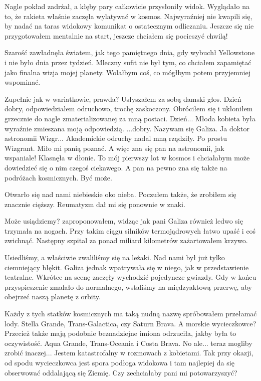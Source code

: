 Nagle pokład zadrżał, a kłęby pary całkowicie przysłoniły widok.
Wyglądało na to, że rakieta właśnie zaczęła wylatywać w kosmos.
Najwyraźniej nie kwapili się, by nadać na taras widokowy komunikat o ostatecznym odliczaniu.
Jeszcze się nie przygotowałem mentalnie na start, jeszcze chciałem się pocieszyć chwilą!

Szarość zawładnęła światem, jak tego pamiętnego dnia, gdy wybuchł Yellowstone i nie było dnia przez tydzień.
Mleczny sufit nie był tym, co chciałem zapamiętać jako finalna wizja mojej planety. Wolałbym coś, co mógłbym potem przyjemniej wspominać.

\begin{dialogue}
	\ds{} Zupełnie jak w wariatkowie, prawda? \dm{} Usłyszałem za sobą damski głos.
	\ds{} Dzień dobry,  \dm{} odpowiedziałem odruchowo, trochę zaskoczony. Obróciłem się i ukłoniłem grzecznie do nagle zmaterializowanej za mną postaci.
	\ds{} Dzień... \dm{} Młoda kobieta była wyraźnie zmieszana moją odpowiedzią. \dm{} ...dobry. Nazywam się Galiza.
	\ds{} Ja doktor astronomii Wizgr... \dm{} Akademickie odruchy nadal mną rządziły. \dm{} Po prostu Wizgrant. Miło mi panią poznać.
	\ds{} A więc zna się pan na astronomii, jak wspaniale! \dm{} Klasnęła w dłonie. \dm{} To mój pierwszy lot w kosmos i chciałabym może dowiedzieć się o nim czegoś ciekawego.
		A pan na pewno zna się także na podróżach kosmicznych.
	\ds{} Być może.
\end{dialogue}

Otwarło się nad nami niebieskie oko nieba.
Poczułem także, że zrobiłem się znacznie cięższy.
Reumatyzm dał mi się ponownie w znaki.

\begin{dialogue}
	\ds{} Może usiądziemy? \dm{} zaproponowałem, widząc jak pani Galiza również ledwo się trzymała na nogach. \dm{} Przy takim ciągu silników termojądrowych łatwo upaść i coś zwichnąć. Następny szpital za ponad miliard kilometrów \dm{} zażartowałem krzywo.
\end{dialogue}

Usiedliśmy, a właściwie zwaliliśmy się na leżaki.
Nad nami był już tylko ciemniejący błękit.
Galiza jednak wpatrywała się w niego, jak w przedstawienie teatralne.
Wkrótce na scenę zaczęły wychodzić pojedyncze gwiazdy.
Gdy w końcu przyspieszenie zmalało do normalnego, wstaliśmy na międzyaktową przerwę, aby obejrzeć naszą planetę z orbity.

\begin{dialogue}
	\ds{} Każdy z tych statków kosmicznych ma taką nudną nazwę \dm{} spróbowałem przełamać lody. \dm{} Stella Grande, Trans-Galactica, czy Saturn Brava. 
	\ds{} A morskie wycieczkowce?  Przecież także mają podobnie beznadziejne imiona \dm{} odrzuciła, jakby była to oczywistość. \dm{} Aqua Grande, Trans-Oceania i Costa Brava.
	\ds{} No ale... teraz mogliby zrobić inaczej... \dm{} Jestem katastrofalny w rozmowach z kobietami. \dm{} 
			Tak przy okazji, od spodu wycieczkowca jest spora podłoga widokowa i tam najlepiej da się obserwować oddalającą się Ziemię. Czy zechciałaby pani mi potowarzyszyć?
\end{dialogue}

